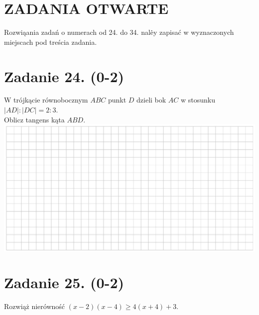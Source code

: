 \documentclass[10pt]{article}
\begin{document}
\section*{ZADANIA OTWARTE}
Rozwiąania zadań o numerach od 24. do 34. nalė̇y zapisać w wyznaczonych miejscach pod treścia zadania.

\section*{Zadanie 24. (0-2)}
W trójkącie równobocznym \(A B C\) punkt \(D\) dzieli bok \(A C\) w stosunku \(|A D|:|D C|=2: 3\).\\
Oblicz tangens kąta \(A B D\).\\
\includegraphics[max width=\textwidth, center]{2024_11_21_94f02db55673a8a7b820g-12(11)}

\section*{Zadanie 25. (0-2)}
Rozwiąż nierówność \((x-2)(x-4) \geq 4(x+4)+3\).
\end{document}
